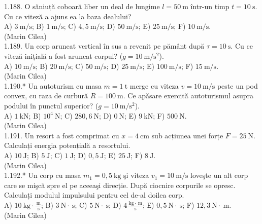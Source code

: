 1.188. O săniuță coboară liber un deal de lungime $l=50 \mathrm{~m}$ într-un timp $t=10 \mathrm{~s}$. Cu ce viteză a ajuns ea la baza dealului?\\ A) $3 \mathrm{~m} / \mathrm{s}$; B) $1 \mathrm{~m} / \mathrm{s}$; C) $4,5 \mathrm{~m} / \mathrm{s}$; D) $50 \mathrm{~m} / \mathrm{s}$; E) $25 \mathrm{~m} / \mathrm{s}$; F) $10 \mathrm{~m} / \mathrm{s}$.\\ (Marin Cilea)\\

1.189. Un corp aruncat vertical în sus a revenit pe pământ după $\tau=10 \mathrm{~s}$. Cu ce viteză inițială a fost aruncat corpul? ($g=10 \mathrm{~m} / \mathrm{s}^{2}$).\\ A) $10 \mathrm{~m} / \mathrm{s}$; B) $20 \mathrm{~m} / \mathrm{s}$; C) $50 \mathrm{~m} / \mathrm{s}$; D) $25 \mathrm{~m} / \mathrm{s}$; E) $100 \mathrm{~m} / \mathrm{s}$; F) $15 \mathrm{~m} / \mathrm{s}$.\\ (Marin Cilea)\\

1.190.* Un autoturism cu masa $m=1 \mathrm{~t}$ merge cu viteza $v=10 \mathrm{~m} / \mathrm{s}$ peste un pod convex, cu raza de curbură $R=100 \mathrm{~m}$. Ce apăsare exercită autoturismul asupra podului în punctul superior? ($g=10 \mathrm{~m} / \mathrm{s}^{2}$).\\ A) $1 \mathrm{~kN}$; B) $10^{4} \mathrm{~N}$; C) $280,6 \mathrm{~N}$; D) $0 \mathrm{~N}$; E) $9 \mathrm{~kN}$; F) $500 \mathrm{~N}$.\\ (Marin Cilea)\\

1.191. Un resort a fost comprimat cu $x=4 \mathrm{~cm}$ sub acțiunea unei forțe $F=25 \mathrm{~N}$. Calculați energia potențială a resortului.\\ A) $10 \mathrm{~J}$; B) $5 \mathrm{~J}$; C) $1 \mathrm{~J}$; D) $0,5 \mathrm{~J}$; E) $25 \mathrm{~J}$; F) $8 \mathrm{~J}$.\\ (Marin Cilea)\\

1.192.* Un corp cu masa $m_{1}=0,5 \mathrm{~kg}$ şi viteza $v_{1}=10 \mathrm{~m} / \mathrm{s}$ loveşte un alt corp care se mişcă spre el pe aceeaşi direcție. După ciocnire corpurile se opresc. Calculați modulul impulsului pentru cel de-al doilea corp.\\ A) $10 \mathrm{~kg} \cdot \frac{\mathrm{~m}}{\mathrm{~s}}$; B) $3 \mathrm{~N} \cdot \mathrm{~s}$; C) $5 \mathrm{~N} \cdot \mathrm{~s}$; D) $4 \frac{\mathrm{~kg} \cdot \mathrm{~m}}{\mathrm{~s}}$; Е) $0,5 \mathrm{~N} \cdot \mathrm{~s}$; F) $12,3 \mathrm{~N} \cdot \mathrm{~m}$.\\ (Marin Cilea)\\

